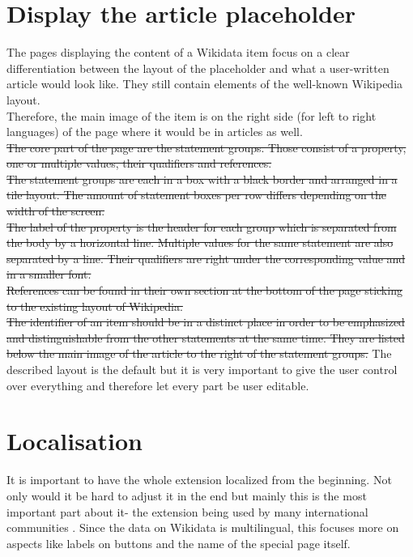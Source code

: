 \section{Display the article placeholder}
The pages displaying the content of a Wikidata item focus on a clear differentiation between the layout of the placeholder and what a user-written article would look like. They still contain elements of the well-known Wikipedia layout. \\
Therefore, the main image of the item is on the right side (for left to right languages) of the page where it would be in articles as well.\\
\st{The core part of the page are the statement groups. Those consist of a property, one or multiple values, their qualifiers and references. \\
The statement groups are each in a box with a black border and arranged in a tile layout. The amount of statement boxes per row differs depending on the width of the screen. \\
The label of the property is the header for each group which is separated from the body by a horizontal line. Multiple values for the same statement are also separated by a line. Their qualifiers are right under the corresponding value and in a smaller font. \\
References can be found in their own section at the bottom of the page sticking to the existing layout of Wikipedia. \\
The identifier of an item should be in a distinct place in order to be emphasized and distinguishable from the other statements at the same time. They are listed below the main image of the article to the right of the statement groups.}
The described layout is the default but it is very important to give the user control over everything and therefore let every part be user editable. \\

\section{Localisation}
It is important to have the whole extension localized from the beginning. Not only would it be hard to adjust it in the end but mainly this is the most important part about it- the extension being used by many international communities%
. Since the data on Wikidata is multilingual, this focuses more on aspects like labels on buttons and the name of the special page itself. \\

